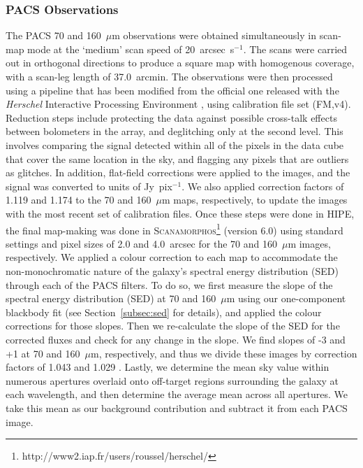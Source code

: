 \subsubsection{PACS Observations}\label{subsubsec:PACS}
The PACS 70 and 160~$\mu$m observations were obtained simultaneously in scan-map mode at the `medium' scan speed of 20~arcsec~s$^{-1}$.  The scans were carried out in orthogonal directions to produce a square map with homogenous coverage, with a scan-leg length of 37.0~arcmin.  The observations were then processed using a pipeline that has been modified from the official one released with the \emph{Herschel} Interactive Processing Environment \citep[HIPE, version 4.0;][]{2010ASPC..434..139O}, using calibration file set (FM,v4).  Reduction steps include protecting the data against possible cross-talk effects between bolometers in the array, and deglitching only at the second level.  This involves comparing the signal detected within all of the pixels in the data cube that cover the same location in the sky, and flagging any pixels that are outliers as glitches.  In addition, flat-field corrections were applied to the images, and the signal was converted to units of Jy~pix$^{-1}$.  We also applied correction factors of 1.119 and 1.174 to the 70 and 160~$\mu$m maps, respectively, to update the images with the most recent set of calibration files.  Once these steps were done in HIPE, the final map-making was done in \textsc{Scanamorphos}\footnote{http://www2.iap.fr/users/roussel/herschel/} (version 6.0) \citep{Roussel_2011_submit} using standard settings and pixel sizes of 2.0 and 4.0~arcsec for the 70 and 160~$\mu$m images, respectively.  We applied a colour correction to each map to accommodate the non-monochromatic nature of the galaxy's spectral energy distribution (SED) through each of the PACS filters.  To do so, we first measure the slope of the spectral energy distribution (SED) at 70 and 160~$\mu$m using our one-component blackbody fit (see Section~\ref{subsec:sed} for details), and applied the colour corrections for those slopes.  Then we re-calculate the slope of the SED for the corrected fluxes and check for any change in the slope.  We find slopes of -3 and +1 at 70 and 160~$\mu$m, respectively, and thus we divide these images by correction factors of 1.043 and 1.029 \citep{PACS_cc_2011}.  Lastly, we determine the mean sky value within numerous apertures overlaid onto off-target regions surrounding the galaxy at each wavelength, and then determine the average mean across all apertures.  We take this mean as our background contribution and subtract it from each PACS image.

